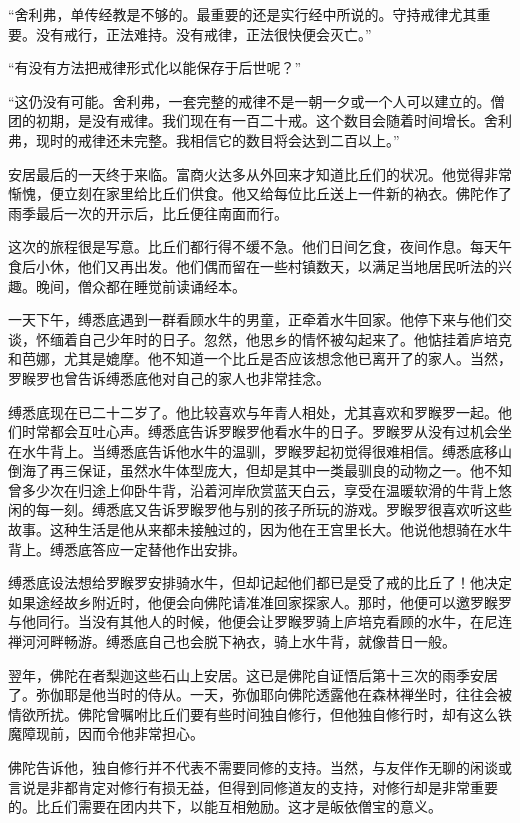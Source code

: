 \documentclass[12pt,twoside,openany]{book}
\begin{document}
“舍利弗，单传经教是不够的。最重要的还是实行经中所说的。守持戒律尤其重要。没有戒行，正法难持。没有戒律，正法很快便会灭亡。”

“有没有方法把戒律形式化以能保存于后世呢？”

“这仍没有可能。舍利弗，一套完整的戒律不是一朝一夕或一个人可以建立的。僧团的初期，是没有戒律。我们现在有一百二十戒。这个数目会随着时间增长。舍利弗，现时的戒律还未完整。我相信它的数目将会达到二百以上。”

安居最后的一天终于来临。富商火达多从外回来才知道比丘们的状况。他觉得非常惭愧，便立刻在家里给比丘们供食。他又给每位比丘送上一件新的衲衣。佛陀作了雨季最后一次的开示后，比丘便往南面而行。

这次的旅程很是写意。比丘们都行得不缓不急。他们日间乞食，夜间作息。每天午食后小休，他们又再出发。他们偶而留在一些村镇数天，以满足当地居民听法的兴趣。晚间，僧众都在睡觉前读诵经本。

一天下午，缚悉底遇到一群看顾水牛的男童，正牵着水牛回家。他停下来与他们交谈，怀缅着自己少年时的日子。忽然，他思乡的情怀被勾起来了。他惦挂着庐培克和芭娜，尤其是媲摩。他不知道一个比丘是否应该想念他已离开了的家人。当然，罗睺罗也曾告诉缚悉底他对自己的家人也非常挂念。

缚悉底现在已二十二岁了。他比较喜欢与年青人相处，尤其喜欢和罗睺罗一起。他们时常都会互吐心声。缚悉底告诉罗睺罗他看水牛的日子。罗睺罗从没有过机会坐在水牛背上。当缚悉底告诉他水牛的温驯，罗睺罗起初觉得很难相信。缚悉底移山倒海了再三保证，虽然水牛体型庞大，但却是其中一类最驯良的动物之一。他不知曾多少次在归途上仰卧牛背，沿着河岸欣赏蓝天白云，享受在温暖软滑的牛背上悠闲的每一刻。缚悉底又告诉罗睺罗他与别的孩子所玩的游戏。罗睺罗很喜欢听这些故事。这种生活是他从来都未接触过的，因为他在王宫里长大。他说他想骑在水牛背上。缚悉底答应一定替他作出安排。

缚悉底设法想给罗睺罗安排骑水牛，但却记起他们都已是受了戒的比丘了！他决定如果途经故乡附近时，他便会向佛陀请准准回家探家人。那时，他便可以邀罗睺罗与他同行。当没有其他人的时候，他便会让罗睺罗骑上庐培克看顾的水牛，在尼连禅河河畔畅游。缚悉底自己也会脱下衲衣，骑上水牛背，就像昔日一般。

翌年，佛陀在者梨迦这些石山上安居。这已是佛陀自证悟后第十三次的雨季安居了。弥伽耶是他当时的侍从。一天，弥伽耶向佛陀透露他在森林禅坐时，往往会被情欲所扰。佛陀曾嘱咐比丘们要有些时间独自修行，但他独自修行时，却有这么铁魔障现前，因而令他非常担心。

佛陀告诉他，独自修行并不代表不需要同修的支持。当然，与友伴作无聊的闲谈或言说是非都肯定对修行有损无益，但得到同修道友的支持，对修行却是非常重要的。比丘们需要在团内共下，以能互相勉励。这才是皈依僧宝的意义。
\end{document}
